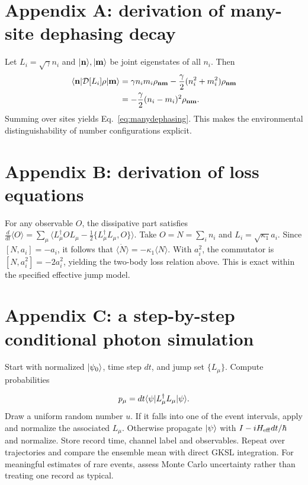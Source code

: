 \documentclass[11pt,a4paper]{article}
\begin{document}
\section{Appendix A: derivation of many-site dephasing decay}
Let $L_i=\sqrt\gamma n_i$ and $|\mathbf n\rangle,|\mathbf m\rangle$ be joint eigenstates of all $n_i$. Then
\begin{align*}
\langle\mathbf n|\mathcal D[L_i]\rho|\mathbf m\rangle
&=\gamma n_i m_i\rho_{\mathbf n\mathbf m}-\frac\gamma2(n_i^2+m_i^2)\rho_{\mathbf n\mathbf m}\\
&=-\frac\gamma2(n_i-m_i)^2\rho_{\mathbf n\mathbf m}.
\end{align*}
Summing over sites yields Eq.~\eqref{eq:manydephasing}. This makes the environmental distinguishability of number configurations explicit.
\section{Appendix B: derivation of loss equations}
For any observable $O$, the dissipative part satisfies $\frac{d}{dt}\langle O\rangle=\sum_\mu\langle L_\mu^\dagger O L_\mu-\frac12\{L_\mu^\dagger L_\mu,O\}\rangle$. Take $O=N=\sum_i n_i$ and $L_i=\sqrt{\kappa_1}a_i$. Since $[N,a_i]=-a_i$, it follows that $\dot{\langle N\rangle}=-\kappa_1\langle N\rangle$. With $a_i^2$, the commutator is $[N,a_i^2]=-2a_i^2$, yielding the two-body loss relation above. This is exact within the specified effective jump model.
\section{Appendix C: a step-by-step conditional photon simulation}
Start with normalized $|\psi_0\rangle$, time step $dt$, and jump set $\{L_\mu\}$. Compute probabilities\par\vspace{-5pt}\[p_\mu=dt\langle\psi| L_\mu^\dagger L_\mu|\psi\rangle.\]\vspace{-8pt}Draw a uniform random number $u$. If it falls into one of the event intervals, apply and normalize the associated $L_\mu$. Otherwise propagate $|\psi\rangle$ with $I-iH_{\rm eff}dt/\hbar$ and normalize. Store record time, channel label and observables. Repeat over trajectories and compare the ensemble mean with direct GKSL integration. For meaningful estimates of rare events, assess Monte Carlo uncertainty rather than treating one record as typical.
\end{document}
